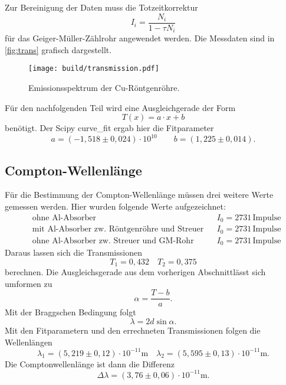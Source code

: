 Zur Bereinigung der Daten muss die Totzeitkorrektur 
\[
	I_i = \frac{N_i}{1 - \tau N_i}
\]
für das Geiger-Müller-Zählrohr angewendet werden.
Die Messdaten sind in \autoref{fig:trans} grafisch dargestellt.
\begin{figure}
	\centering
	\texttt{[image: build/transmission.pdf]}
	\caption{Emissionsspektrum der Cu-Röntgenröhre.}
	\label{fig:trans}
\end{figure}
Für den nachfolgenden Teil wird eine Ausgleichgerade der Form 
\[
	T(x) = a\cdot x + b
\]
benötigt. Der Scipy curve\_fit ergab hier die Fitparameter
\begin{equation}
	a = (-1,518 \pm 0,024) \cdot 10^{10}
	\qquad
	b = (1,225 \pm 0,014).
\end{equation}

\newpage
\subsection{Compton-Wellenlänge}
\label{sec:Compton-Wellenlänge}
Für die Bestimmung der Compton-Wellenlänge müssen drei weitere Werte gemessen werden. Hier
wurden folgende Werte aufgezeichnet:
\begin{align*}
	&\text{ohne Al-Absorber} & & I_0 = 2731 \, \text{Impulse} \\
	&\text{mit Al-Absorber zw. Röntgenröhre und Streuer} & & I_0 = 2731 \, \text{Impulse} \\
	&\text{ohne Al-Absorber zw. Streuer und GM-Rohr} & & I_0 = 2731 \, \text{Impulse}
\end{align*}
Daraus lassen sich die Transmissionen
\begin{equation}
	T_1 = 0,432 \quad
	T_2 = 0,375
\end{equation}
berechnen. Die Ausgleichsgerade aus dem vorherigen Abschnittlässt sich umformen zu
\[ \alpha = \frac{T - b}{a}. \]
Mit der Braggschen Bedingung folgt 
\[
	\lambda = 2d \sin\alpha.
\]
Mit den Fitparametern und den errechneten Transmissionen folgen die Wellenlängen
\begin{equation}
	\lambda_1 = (5,219 \pm 0,12) \cdot 10^{-11} \si{\meter}
	\quad
	\lambda_2 = (5,595 \pm 0,13) \cdot 10^{-11} \si{\meter}.
\end{equation}
Die Comptonwellenlänge ist dann die Differenz
\[
	\Delta \lambda = (3,76 \pm 0,06) \cdot 10^{-11} \si{\meter}.
\]
	
